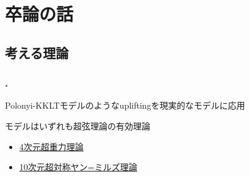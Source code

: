 \documentclass[
  a4paper,uplatex,dvipdfmx,10pt,
  xcolor = {dvipsnames,svgnames},
  hyperref ={colorlinks=true,citecolor=Navy,linkcolor=NavyBlue,urlcolor=purple}
]{beamer}
\begin{document}
\section{卒論の話}

\subsection{考える理論}

\begin{frame}
  \frametitle{\thesection.\thesubsection\ \subsecname}
  \color{DarkMagenta}

  Polonyi-KKLTモデルのようなupliftingを現実的なモデルに応用

  \vspace{5pt}

  モデルはいずれも超弦理論の有効理論
  \begin{itemize}
    \color{DarkMagenta}
    \item 
    \hyperlink{cutted_4dSUGRA}{4次元超重力理論}
    \item 
    \hyperlink{cutted_10dSYM}{10次元超対称ヤン=ミルズ理論}
  \end{itemize}

\end{frame}
\end{document}
